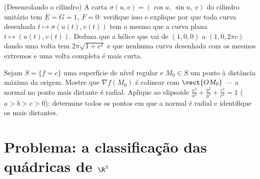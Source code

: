 \begin{exercise}[$\star\star$]\label{exo:b2:surfaces:11}
(Desenrolando o cilindro) A carta $\sigma(u, v) = (\cos u,\
\sin u,\ v)$ do cilindro unitário tem $E = G = 1$, $F = 0$:
verifique isso e explique por que toda curva desenhada $t \mapsto
\sigma(u(t), v(t))$ tem o mesmo  que a curva plana $t
\mapsto (u(t), v(t))$. Deduza que a hélice que vai de $(1, 0, 0)$
a $(1, 0, 2\pi c)$ dando uma volta tem 
$2\pi\sqrt{1 + c^2}$ e que nenhuma curva desenhada com os mesmos
extremos e uma volta completa é mais curta.
\end{exercise}

\begin{exercise}[$\star\star\star$]\label{exo:b2:surfaces:12}
Sejam $S = \{f = c\}$ uma superfície de nível regular  e
$M_0 \in S$ um ponto à distância máxima da origem. Mostre
que $\nabla f(M_0)$ é colinear com $\vect{OM_0}$ --- a
normal no ponto mais distante é radial. Aplique ao elipsoide
$\frac{x^2}{a^2} + \frac{y^2}{b^2} + \frac{z^2}{c^2} = 1$ ($a >
b > c > 0$): determine todos os pontos em que a normal é radial e
identifique os mais distantes.
\end{exercise}

\section{Problema: a classificação das quádricas de
$\R^3$}

